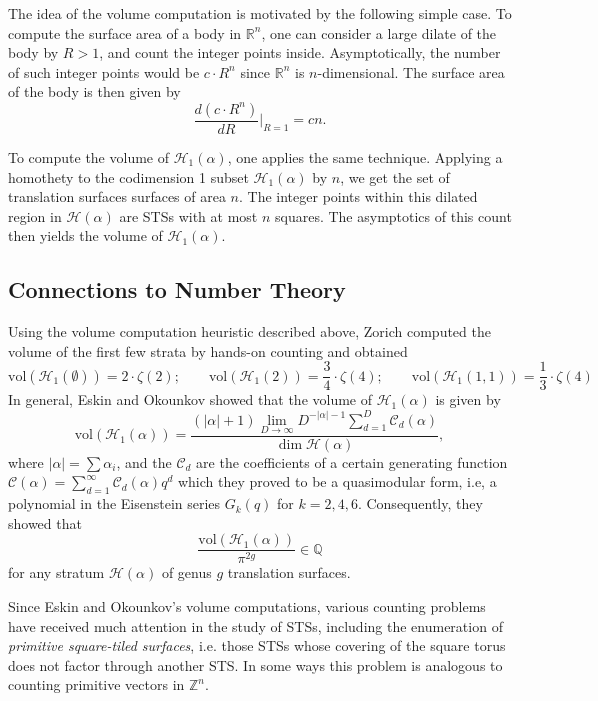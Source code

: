 \documentclass[12pt]{amsart}
\numberwithin{equation}{section}
\numberwithin{theorem}{section}
\newcommand{\RR}{\mathbb{R}}
\newcommand{\QQ}{\mathbb{Q}}
\newcommand{\calH}{\mathcal{H}}
\newcommand{\ZZ}{\mathbb{Z}}
\newcommand{\vol}{\mathrm{vol}}
\newcommand{\calC}{\mathcal{C}}
\begin{document}
The idea of the volume computation is motivated by the following simple case. To compute the surface area of a body in $\RR^n$, one can consider a large dilate of the body by $R > 1$, and count the integer points inside. Asymptotically, the number of such integer points would be $c\cdot R^n$ since $\RR^n$ is $n$-dimensional. The surface area of the body is then given by 
$$ \frac{d (c\cdot R^n)}{dR}\bigg|_{R = 1} = cn.$$

To compute the volume of $\calH_1(\alpha)$, one applies the same technique. Applying a homothety to the codimension 1 subset $\calH_1(\alpha)$ by $n$, we get the set of translation surfaces surfaces of area $n$. The integer points within this dilated region in $\calH(\alpha)$ are STSs with at most $n$ squares. The asymptotics of this count then yields the volume of $\calH_1(\alpha)$.






\subsection{Connections to Number Theory}

Using the volume computation heuristic described above, Zorich \cite{Zor} computed the volume of the first few strata by hands-on counting and obtained 
$$\vol(\calH_1(\emptyset)) = 2\cdot\zeta(2); \qquad \vol(\calH_1(2)) = \frac{3}{4}\cdot \zeta(4); \qquad \vol(\calH_1(1,1)) = \frac{1}{3}\cdot\zeta(4)$$
In general, Eskin and Okounkov \cite{EskOk} showed that the volume of $\calH_1(\alpha)$ is given by
$$ 
\vol(\calH_1(\alpha)) =  \frac{(|\alpha|+1) \lim_{D \rightarrow \infty} D^{-|\alpha|-1} \sum_{d =1}^D \calC_d(\alpha)}{\dim \calH(\alpha)},
$$
where $|\alpha| = \sum \alpha_i$, and the $\calC_d$ are the coefficients of a certain generating function $ \calC(\alpha) = \sum_{d =1}^\infty \calC_d(\alpha) q^d $ which they proved to be a quasimodular form, i.e, a polynomial in the Eisenstein series $G_k(q)$ for $k = 2, 4, 6$. Consequently, they showed that
$$ \frac{\vol(\calH_1(\alpha))}{\pi^{2g}} \in \QQ$$ for any stratum $\calH(\alpha)$ of genus $g$ translation surfaces. 

Since Eskin and Okounkov's volume computations, various counting problems have received much attention in the study of STSs, including the enumeration of \emph{primitive square-tiled surfaces}, i.e. those STSs whose covering of the square torus does not factor through another STS.  In some ways this problem is analogous to counting primitive vectors in $\ZZ^n$. 
\end{document}
